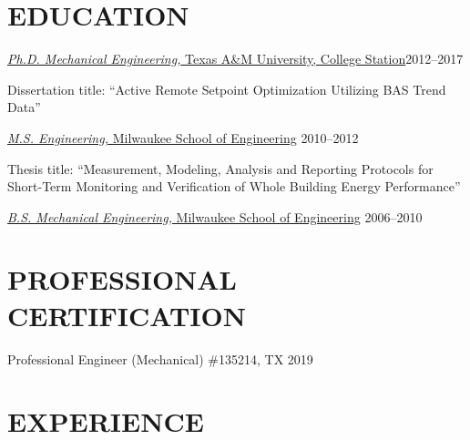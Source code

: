\documentclass[margin]{res} %
\begin{document}
\begin{resume}





\section{EDUCATION}

\underline{{\textit{Ph.D. Mechanical Engineering,} Texas A\&M University, College Station}}\hfill 2012--2017

\parbox{11cm}{Dissertation title: ``Active Remote Setpoint Optimization Utilizing BAS Trend Data''}

\underline{{\sl M.S. Engineering,} Milwaukee School of Engineering} \hfill 2010--2012

\parbox{11cm}{Thesis title: ``Measurement, Modeling, Analysis and Reporting Protocols for Short-Term Monitoring and Verification of Whole Building Energy Performance''}

\underline{{\sl B.S. Mechanical Engineering,} Milwaukee School of Engineering} \hfill 2006--2010

\section{PROFESSIONAL CERTIFICATION}

Professional Engineer (Mechanical) \#135214, TX \hfill 2019


\vspace{0.1in}

\section{EXPERIENCE}


\end{resume}
\end{document}
